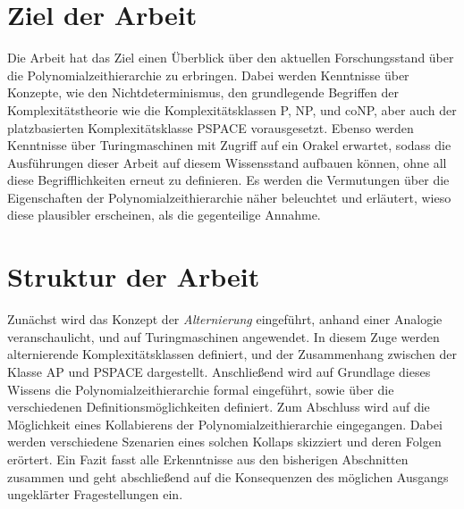 \section{Ziel der Arbeit}
Die Arbeit hat das Ziel einen Überblick über den aktuellen Forschungsstand über die Polynomialzeithierarchie zu erbringen. Dabei werden Kenntnisse über Konzepte, wie den Nichtdeterminismus, den grundlegende Begriffen der Komplexitätstheorie
wie die Komplexitätsklassen P, NP, und coNP,  aber auch der platzbasierten Komplexitätsklasse PSPACE vorausgesetzt. Ebenso werden Kenntnisse über Turingmaschinen mit Zugriff auf ein Orakel erwartet, sodass die Ausführungen dieser Arbeit auf diesem Wissensstand aufbauen können, ohne all diese Begrifflichkeiten erneut zu definieren.
Es werden die Vermutungen über die Eigenschaften der Polynomialzeithierarchie näher beleuchtet und erläutert, wieso diese plausibler erscheinen, als die gegenteilige Annahme.

\section{Struktur der Arbeit}
Zunächst wird das Konzept der \emph{Alternierung} eingeführt, anhand einer Analogie veranschaulicht, und auf Turingmaschinen angewendet. In diesem Zuge werden alternierende Komplexitätsklassen definiert, und der Zusammenhang 
zwischen der Klasse AP und PSPACE dargestellt. Anschließend wird auf Grundlage dieses Wissens die Polynomialzeithierarchie formal eingeführt, sowie über die verschiedenen Definitionsmöglichkeiten definiert.
Zum Abschluss wird auf die Möglichkeit eines Kollabierens der Polynomialzeithierarchie eingegangen.
Dabei werden verschiedene Szenarien eines solchen Kollaps skizziert und deren Folgen erörtert.
Ein Fazit fasst alle Erkenntnisse aus den bisherigen Abschnitten zusammen und geht abschließend auf die Konsequenzen des möglichen Ausgangs ungeklärter Fragestellungen ein.





